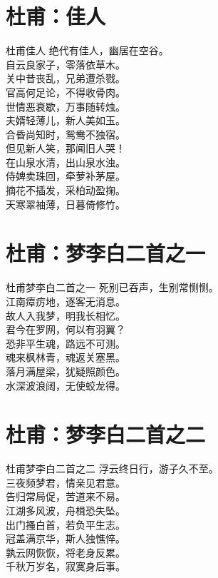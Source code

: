 \documentclass[12pt,oneside,a5paper]{book}
\begin{document}
\chapter{杜甫：佳人}
\begin{poemzh}{杜甫}{佳人}
绝代有佳人，幽居在空谷。\\
自云良家子，零落依草木。\\
关中昔丧乱，兄弟遭杀戮。\\
官高何足论，不得收骨肉。\\
世情恶衰歇，万事随转烛。\\
夫婿轻薄儿，新人美如玉。\\
合昏尚知时，鸳鸯不独宿。\\
但见新人笑，那闻旧人哭！\\
在山泉水清，出山泉水浊。\\
侍婢卖珠回，牵萝补茅屋。\\
摘花不插发，采柏动盈掬。\\
天寒翠袖薄，日暮倚修竹。\\ 
\end{poemzh}

\chapter{杜甫：梦李白二首之一}
\begin{poemzh}{杜甫}{梦李白二首之一}
死别已吞声，生别常恻恻。\\
江南瘴疠地，逐客无消息。\\
故人入我梦，明我长相忆。\\
君今在罗网，何以有羽翼？\\
恐非平生魂，路远不可测。\\
魂来枫林青，魂返关塞黑。\\
落月满屋梁，犹疑照颜色。\\
水深波浪阔，无使蛟龙得。\\ 
\end{poemzh}



\chapter{杜甫：梦李白二首之二}
\begin{poemzh}{杜甫}{梦李白二首之二}
浮云终日行，游子久不至。\\
三夜频梦君，情亲见君意。\\
告归常局促，苦道来不易。\\
江湖多风波，舟楫恐失坠。\\
出门搔白首，若负平生志。\\
冠盖满京华，斯人独憔悴。\\
孰云网恢恢，将老身反累。\\
千秋万岁名，寂寞身后事。\\
\end{poemzh}
\end{document}
